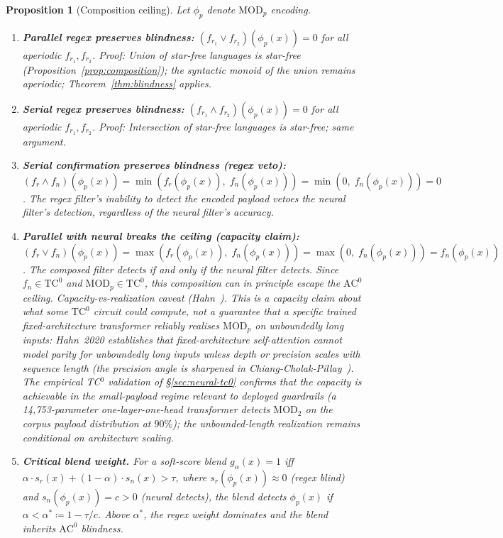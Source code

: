 \documentclass[letterpaper,twocolumn,10pt]{article}
\newtheorem{proposition}[theorem]{Proposition}
\theoremstyle{definition}
\theoremstyle{remark}
\begin{document}
\begin{proposition}[Composition ceiling]\label{prop:filter-composition}
Let $\phi_p$ denote $\mathrm{MOD}_p$ encoding.
\begin{enumerate}
\item \textbf{Parallel regex preserves blindness:}
  $(f_{r_1} \vee f_{r_2})(\phi_p(x)) = 0$ for all aperiodic $f_{r_1}, f_{r_2}$.
  \emph{Proof:} Union of star-free languages is star-free
  (Proposition~\ref{prop:composition}); the syntactic monoid of the union remains
  aperiodic; Theorem~\ref{thm:blindness} applies.

\item \textbf{Serial regex preserves blindness:}
  $(f_{r_1} \wedge f_{r_2})(\phi_p(x)) = 0$ for all aperiodic $f_{r_1}, f_{r_2}$.
  \emph{Proof:} Intersection of star-free languages is star-free; same argument.

\item \textbf{Serial confirmation preserves blindness (regex veto):}
  $(f_r \wedge f_n)(\phi_p(x)) = \min(f_r(\phi_p(x)),\; f_n(\phi_p(x)))
  = \min(0,\; f_n(\phi_p(x))) = 0$.
  The regex filter's inability to detect the encoded payload vetoes the neural
  filter's detection, regardless of the neural filter's accuracy.

\item \textbf{Parallel with neural breaks the ceiling (capacity claim):}
  $(f_r \vee f_n)(\phi_p(x)) = \max(f_r(\phi_p(x)),\; f_n(\phi_p(x)))
  = \max(0,\; f_n(\phi_p(x))) = f_n(\phi_p(x))$.
  The composed filter detects if and only if the neural filter detects.
  Since $f_n \in \mathrm{TC}^0$ and $\mathrm{MOD}_p \in \mathrm{TC}^0$,
  this composition \emph{can in principle} escape the $\mathrm{AC}^0$
  ceiling. \emph{Capacity-vs-realization caveat (Hahn~\cite{hahn2020limitations}).}
  This is a capacity claim about what some $\mathrm{TC}^0$ circuit
  could compute, not a guarantee that a specific trained
  fixed-architecture transformer reliably realises $\mathrm{MOD}_p$ on
  unboundedly long inputs: Hahn~2020 establishes that fixed-architecture
  self-attention cannot model parity for unboundedly long inputs unless
  depth or precision scales with sequence length (the precision angle
  is sharpened in Chiang-Cholak-Pillay~\cite{chiang2023tighter}). The empirical
  TC$^0$ validation of \S\ref{sec:neural-tc0} confirms that the capacity
  is achievable in the small-payload regime relevant to deployed
  guardrails (a 14{,}753-parameter one-layer-one-head transformer detects
  $\mathrm{MOD}_2$ on the corpus payload distribution at $90\%$); the
  unbounded-length realization remains conditional on architecture
  scaling.

\item \textbf{Critical blend weight.}
  For a soft-score blend $g_\alpha(x) = 1$ iff
  $\alpha \cdot s_r(x) + (1-\alpha) \cdot s_n(x) > \tau$,
  where $s_r(\phi_p(x)) \approx 0$ (regex blind) and $s_n(\phi_p(x)) = c > 0$
  (neural detects), the blend detects $\phi_p(x)$ if
  $\alpha < \alpha^* \coloneqq 1 - \tau / c$.
  Above $\alpha^*$, the regex weight dominates and the blend inherits
  $\mathrm{AC}^0$ blindness.
\end{enumerate}
\end{proposition}
\end{document}
